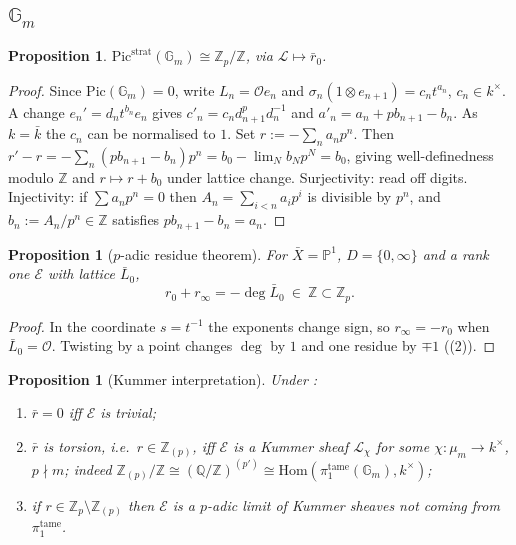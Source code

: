 \documentclass[11pt,reqno]{amsart}
\newcommand{\Zp}{\mathbb{Z}_p}
\newcommand{\ZZ}{\mathbb{Z}}
\newcommand{\QQ}{\mathbb{Q}}
\newcommand{\GG}{\mathbb{G}}
\newcommand{\PP}{\mathbb{P}}
\newcommand{\cO}{\mathcal{O}}
\newcommand{\cE}{\mathcal{E}}
\newcommand{\cL}{\mathcal{L}}
\newcommand{\tame}{\mathrm{tame}}
\newcommand{\strat}{\mathrm{strat}}
\newcommand{\Pic}{\mathrm{Pic}}
\newcommand{\Hom}{\mathrm{Hom}}
\theoremstyle{plain}
\newtheorem{proposition}[theorem]{Proposition}
\theoremstyle{definition}
\theoremstyle{remark}
\numberwithin{equation}{section}
\begin{document}
\subsection{$\GG_m$}
\begin{proposition}\label{prop:Gm}
$\Pic^{\strat}(\GG_m)\cong\Zp/\ZZ$, via $\cL\mapsto\bar r_0$.
\end{proposition}
\begin{proof}
Since $\Pic(\GG_m)=0$, write $L_n=\cO e_n$ and
$\sigma_n(1\otimes e_{n+1})=c_nt^{a_n}$, $c_n\in k^\times$.  A change
$e_n'=d_nt^{b_n}e_n$ gives $c'_n=c_nd_{n+1}^pd_n^{-1}$ and
$a'_n=a_n+pb_{n+1}-b_n$.  As $k=\bar k$ the $c_n$ can be normalised to
$1$.  Set $r:=-\sum_na_np^n$.  Then
$r'-r=-\sum_n(pb_{n+1}-b_n)p^n=b_0-\lim_Nb_Np^N=b_0$, giving
well-definedness modulo $\ZZ$ and $r\mapsto r+b_0$ under lattice change.
Surjectivity: read off digits.  Injectivity: if $\sum a_np^n=0$ then
$A_n=\sum_{i<n}a_ip^i$ is divisible by $p^n$, and $b_n:=A_n/p^n\in\ZZ$
satisfies $pb_{n+1}-b_n=a_n$.
\end{proof}

\begin{proposition}[$p$-adic residue theorem]\label{prop:restheorem}
For $\bar X=\PP^1$, $D=\{0,\infty\}$ and a rank one $\cE$ with lattice
$\bar L_0$,
\[
   r_0+r_\infty=-\deg\bar L_0\ \in\ \ZZ\subset\Zp .
\]
\end{proposition}
\begin{proof}
In the coordinate $s=t^{-1}$ the exponents change sign, so
$r_\infty=-r_0$ when $\bar L_0=\cO$.  Twisting by a point changes
$\deg$ by $1$ and one residue by $\mp1$ ((2)).
\end{proof}

\begin{proposition}[Kummer interpretation]\label{prop:kummer}
Under :
\begin{enumerate}
\item $\bar r=0$ iff $\cE$ is trivial;
\item $\bar r$ is torsion, i.e.\ $r\in\ZZ_{(p)}$, iff $\cE$ is a Kummer
      sheaf $\cL_\chi$ for some $\chi\colon\mu_m\to k^\times$,
      $p\nmid m$; indeed
      $\ZZ_{(p)}/\ZZ\cong(\QQ/\ZZ)^{(p')}\cong
      \Hom(\pi_1^{\tame}(\GG_m),k^\times)$;
\item if $r\in\Zp\setminus\ZZ_{(p)}$ then $\cE$ is a $p$-adic limit of
      Kummer sheaves not coming from $\pi_1^{\tame}$.
\end{enumerate}
\end{proposition}
\end{document}
